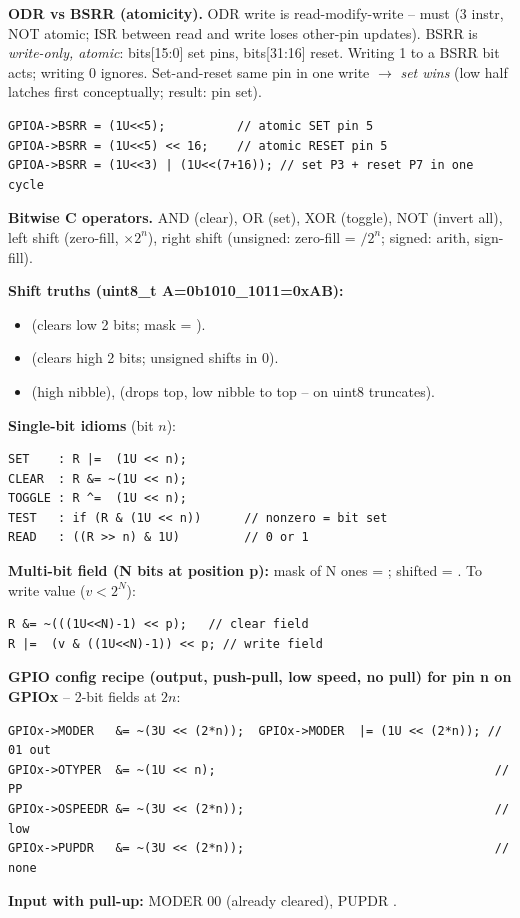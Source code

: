\textbf{ODR vs BSRR (atomicity).} ODR write is read-modify-write -- must  (3 instr, NOT atomic; ISR between read and write loses other-pin updates). BSRR is \emph{write-only, atomic}: bits[15:0] set pins, bits[31:16] reset. Writing 1 to a BSRR bit acts; writing 0 ignores. Set-and-reset same pin in one write $\to$ \emph{set wins} (low half latches first conceptually; result: pin set).
\begin{lstlisting}[language={}]
GPIOA->BSRR = (1U<<5);          // atomic SET pin 5
GPIOA->BSRR = (1U<<5) << 16;    // atomic RESET pin 5
GPIOA->BSRR = (1U<<3) | (1U<<(7+16)); // set P3 + reset P7 in one cycle
\end{lstlisting}

\textbf{Bitwise C operators.} \cee{\&} AND (clear), \cee{|} OR (set), \cee{\^} XOR (toggle), \cee{\~} NOT (invert all), \cee{<<} left shift (zero-fill, $\times 2^n$), \cee{>>} right shift (unsigned: zero-fill = $/2^n$; signed: arith, sign-fill).

\textbf{Shift truths (uint8\_t A=0b1010\_1011=0xAB):}
\begin{itemize}
\item {} (clears low 2 bits; mask = ).
\item {} (clears high 2 bits; unsigned shifts in 0).
\item {} (high nibble),  (drops top, low nibble to top -- on uint8 truncates).
\end{itemize}

\textbf{Single-bit idioms} (bit $n$):
\begin{lstlisting}[language={}]
SET    : R |=  (1U << n);
CLEAR  : R &= ~(1U << n);
TOGGLE : R ^=  (1U << n);
TEST   : if (R & (1U << n))      // nonzero = bit set
READ   : ((R >> n) & 1U)         // 0 or 1
\end{lstlisting}

\textbf{Multi-bit field (N bits at position p):} mask of N ones = ; shifted = . To write value  ($v < 2^N$):
\begin{lstlisting}[language={}]
R &= ~(((1U<<N)-1) << p);   // clear field
R |=  (v & ((1U<<N)-1)) << p; // write field
\end{lstlisting}

\textbf{GPIO config recipe (output, push-pull, low speed, no pull) for pin n on GPIOx} -- 2-bit fields at $2n$:
\begin{lstlisting}[language={}]
GPIOx->MODER   &= ~(3U << (2*n));  GPIOx->MODER  |= (1U << (2*n)); // 01 out
GPIOx->OTYPER  &= ~(1U << n);                                       // PP
GPIOx->OSPEEDR &= ~(3U << (2*n));                                   // low
GPIOx->PUPDR   &= ~(3U << (2*n));                                   // none
\end{lstlisting}
\textbf{Input with pull-up:} MODER 00 (already cleared), PUPDR .

